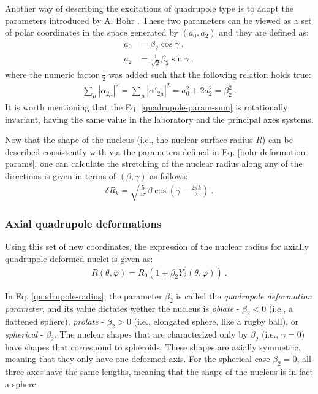 Another way of describing the excitations of quadrupole type is to adopt the parameters introduced by A. Bohr \cite{bohr1954rotational}. These two parameters can be viewed as a set of polar coordinates in the space generated by $(a_0,a_2)$ and they are defined as:
\begin{align}
    a_0&=\beta_2\cos\gamma\ , \nonumber \\
    a_2&=\frac{1}{\sqrt{2}}\beta_2\sin\gamma\ , \label{bohr-deformation-params}
\end{align}
where the numeric factor $\frac{1}{2}$ was added such that the following relation holds true:
\begin{align}
    \sum_\mu\left|\alpha_{2\mu}\right|^2=\sum_\mu\left|\alpha'_{2\mu}\right|^2=a_0^2+2a_2^2=\beta_2^2\ .
    \label{quadrupole-param-sum}
\end{align}
It is worth mentioning that the Eq. \ref{quadrupole-param-sum} is rotationally invariant, having the same value in the laboratory and the principal axes systems.

Now that the shape of the nucleus (i.e., the nuclear surface radius $R$) can be described consistently with via the parameters defined in Eq. \ref{bohr-deformation-params}, one can calculate the stretching of the nuclear radius along any of the directions is given in terms of $(\beta,\gamma)$ as follows:
\begin{align}
    \delta R_k=\sqrt{\frac{5}{4\pi}}\beta\cos(\gamma-\frac{2\pi k}{3})\ .
\end{align}

\subsubsection{Axial quadrupole deformations}

Using this set of new coordinates, the expression of the nuclear radius for axially quadrupole-deformed nuclei is given as:
\begin{align}
    R(\theta,\varphi)=R_0\left(1+\beta_2 Y_2^0(\theta,\varphi)\right)\ . \label{quadrupole-radius}
\end{align}

In Eq. \ref{quadrupole-radius}, the parameter $\beta_2$ is called the \emph{quadrupole deformation parameter}, and its value dictates wether the nucleus is \emph{oblate} - $\beta_2<0$ (i.e., a flattened sphere), \emph{prolate} - $\beta_2>0$ (i.e., elongated sphere, like a rugby ball), or \emph{spherical} - $\beta_2$.  The nuclear shapes that are characterized only by $\beta_2$ (i.e., $\gamma=0$) have shapes that correspond to spheroids. These shapes are axially symmetric, meaning that they only have one deformed axis. For the spherical case $\beta_2=0$, all three axes have the same lengths, meaning that the shape of the nucleus is in fact a sphere.

